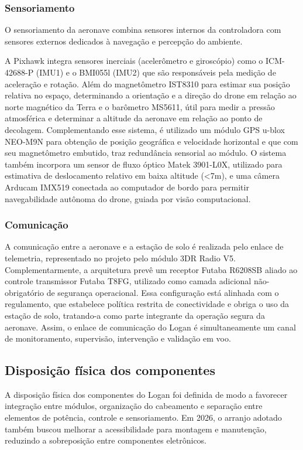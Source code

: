 \subsubsection{Sensoriamento}

O sensoriamento da aeronave combina sensores internos da controladora com sensores externos dedicados à navegação e percepção do ambiente.

A Pixhawk integra sensores inerciais (acelerômetro e giroscópio) como o ICM-42688-P (IMU1) e o BMI055l (IMU2) que são responsáveis pela medição de aceleração e rotação. Além do magnetômetro IST8310 para estimar sua posição relativa no espaço, determinando a orientação e a direção do drone em relação ao norte magnético da Terra e o barômetro MS5611, útil para medir a pressão atmosférica e determinar a altitude da aeronave em relação ao ponto de decolagem. Complementando esse sistema, é utilizado um módulo GPS u-blox NEO-M9N para obtenção de posição geográfica e velocidade horizontal e que com seu magnetômetro embutido, traz redundância sensorial ao módulo. O sistema também incorpora um sensor de fluxo óptico Matek 3901-L0X, utilizado para estimativa de deslocamento relativo em baixa altitude (<7m), e uma câmera Arducam IMX519 conectada ao computador de bordo para permitir navegabilidade autônoma do drone, guiada por visão computacional.

\subsubsection{Comunicação}

A comunicação entre a aeronave e a estação de solo é realizada pelo enlace de telemetria, representado no projeto pelo módulo 3DR Radio V5. Complementarmente, a arquitetura prevê um receptor Futaba R6208SB aliado ao controle transmissor Futaba T8FG, utilizado como camada adicional não-obrigatório de segurança operacional. Essa configuração está alinhada com o regulamento, que estabelece política restrita de conectividade e obriga o uso da estação de solo, tratando-a como parte integrante da operação segura da aeronave. Assim, o enlace de comunicação do Logan é simultaneamente um canal de monitoramento, supervisão, intervenção e validação em voo.

\subsection{Disposição física dos componentes}

A disposição física dos componentes do Logan foi definida de modo a favorecer integração entre módulos, organização do cabeamento e separação entre elementos de potência, controle e sensoriamento. Em 2026, o arranjo adotado também buscou melhorar a acessibilidade para montagem e manutenção, reduzindo a sobreposição entre componentes eletrônicos.

